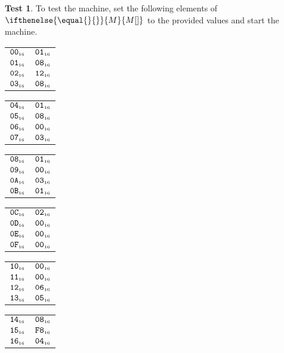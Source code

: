 \documentclass[a4paper,12pt]{article}
\makeatletter
\newcommand{\num}[1]{\texttt{#1}}
\newcommand{\hex}[1]{\num{#1}_{\textup{\tiny 16}}}
\newcommand{\MEM}[1]{\ifthenelse{\equal{#1}{}}{M}{M[#1]}}
\theoremstyle{definition}
\newtheorem{test}{Test}
\newenvironment{memtable}{%
  \begin{trivlist}
    \item
    }{%
    \end{trivlist}}
\newenvironment{memcolumn}{%
  \begin{tabular}{@{}ll@{}}
    \hline}
    {%
    \hline
  \end{tabular}}
\newcommand{\memspace}{\qquad}
\makeatother
\begin{document}
\begin{test}
  To test the machine, set the following elements of $\MEM{}$ to the provided values and start the machine.
  \begin{memtable}
    \begin{memcolumn}
      $\hex{00}$ & $\hex{01}$ \\
      $\hex{01}$ & $\hex{08}$ \\
      $\hex{02}$ & $\hex{12}$ \\
      $\hex{03}$ & $\hex{08}$ \\
    \end{memcolumn}
    \memspace
    \begin{memcolumn}
      $\hex{04}$ & $\hex{01}$ \\
      $\hex{05}$ & $\hex{08}$ \\
      $\hex{06}$ & $\hex{00}$ \\
      $\hex{07}$ & $\hex{03}$ \\
    \end{memcolumn}
    \memspace
    \begin{memcolumn}
      $\hex{08}$ & $\hex{01}$ \\
      $\hex{09}$ & $\hex{00}$ \\
      $\hex{0A}$ & $\hex{03}$ \\
      $\hex{0B}$ & $\hex{01}$ \\
    \end{memcolumn}
    \memspace
    \begin{memcolumn}
      $\hex{0C}$ & $\hex{02}$ \\
      $\hex{0D}$ & $\hex{00}$ \\
      $\hex{0E}$ & $\hex{00}$ \\
      $\hex{0F}$ & $\hex{00}$ \\
    \end{memcolumn}
    \memspace
    \begin{memcolumn}
      $\hex{10}$ & $\hex{00}$ \\
      $\hex{11}$ & $\hex{00}$ \\
      $\hex{12}$ & $\hex{06}$ \\
      $\hex{13}$ & $\hex{05}$ \\
    \end{memcolumn}
    \memspace
    \begin{memcolumn}
      $\hex{14}$ & $\hex{08}$ \\
      $\hex{15}$ & $\hex{F8}$ \\
      $\hex{16}$ & $\hex{04}$ \\

\end{memcolumn}
\end{memtable}
\end{test}
\end{document}
